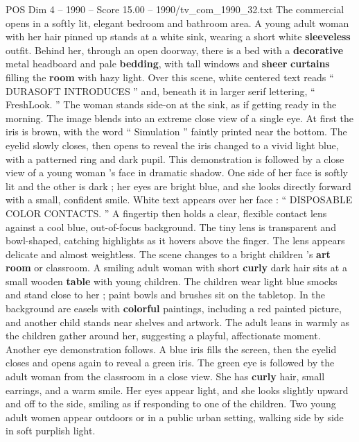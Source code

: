 \begin{textsample}{POS Dim 4 – 1990 – Score 15.00 – 1990/tv\_com\_1990\_32.txt}  \label{ex:f4_pos_072}
The commercial opens in a softly lit, elegant bedroom and bathroom area.
A young adult woman with her hair pinned up stands at a white sink, wearing a short white \textbf{sleeveless} outfit.
Behind her, through an open doorway, there is a bed with a \textbf{decorative} metal headboard and pale \textbf{bedding}, with tall windows and \textbf{sheer} \textbf{curtains} filling the \textbf{room} with hazy light.
Over this scene, white centered text reads “ DURASOFT INTRODUCES ” and, beneath it in larger serif lettering, “ FreshLook. ” The woman stands side-on at the sink, as if getting ready in the morning.
The image blends into an extreme close view of a single eye.
At first the iris is brown, with the word “ Simulation ” faintly printed near the bottom.
The eyelid slowly closes, then opens to reveal the iris changed to a vivid light blue, with a patterned ring and dark pupil.
This demonstration is followed by a close view of a young woman ’s face in dramatic shadow.
One side of her face is softly lit and the other is dark ; her eyes are bright blue, and she looks directly forward with a small, confident smile.
White text appears over her face : “ DISPOSABLE COLOR CONTACTS. ” A fingertip then holds a clear, flexible contact lens against a cool blue, out-of-focus background.
The tiny lens is transparent and bowl-shaped, catching highlights as it hovers above the finger.
The lens appears delicate and almost weightless.
The scene changes to a bright children ’s \textbf{art} \textbf{room} or classroom.
A smiling adult woman with short \textbf{curly} dark hair sits at a small wooden \textbf{table} with young children.
The children wear light blue smocks and stand close to her ; paint bowls and brushes sit on the tabletop.
In the background are easels with \textbf{colorful} paintings, including a red painted picture, and another child stands near shelves and artwork.
The adult leans in warmly as the children gather around her, suggesting a playful, affectionate moment.
Another eye demonstration follows.
A blue iris fills the screen, then the eyelid closes and opens again to reveal a green iris.
The green eye is followed by the adult woman from the classroom in a close view.
She has \textbf{curly} hair, small earrings, and a warm smile.
Her eyes appear light, and she looks slightly upward and off to the side, smiling as if responding to one of the children.
Two young adult women appear outdoors or in a public urban setting, walking side by side in soft purplish light.

\end{textsample}
